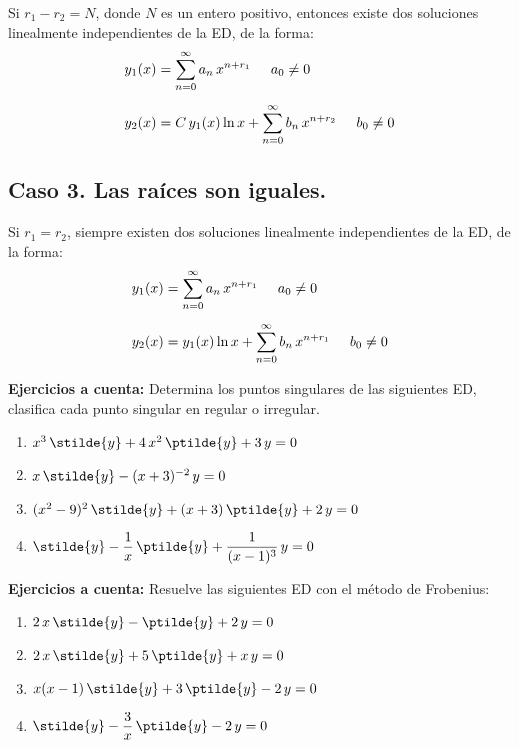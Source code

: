Si $r_{1} - r_{2} = N$, donde $N$ es un entero positivo, entonces existe dos soluciones linealmente independientes de la ED, de la forma:
\begin{subequations}
\begin{align}
y_{1} (x) &= \sum_{n=0}^{\infty} a_{n} \, x^{n+r_{1}} \hspace{0.5cm} a_{0} \neq 0 \label{eq:ecuacion_20a} \\[0.5em]
y_{2} (x) &= C \, y_{1} (x) \ln x + \sum_{n=0}^{\infty} b_{n} \, x^{n+r_{2}} \hspace{0.5cm} b_{0} \neq 0 \label{eq:ecuacion_20b}
\end{align}
\end{subequations}

\subsection*{Caso 3. Las raíces son iguales.}

Si $r_{1} = r_{2}$, siempre existen dos soluciones linealmente independientes de la ED, de la forma:
\begin{subequations}
\begin{align}
y_{1} (x) &= \sum_{n=0}^{\infty} a_{n} \, x^{n+r_{1}} \hspace{0.5cm} a_{0} \neq 0 \label{eq:ecuacion_21a} \\[0.5em]
y_{2} (x) &= y_{1} (x) \ln x + \sum_{n=0}^{\infty} b_{n} \, x^{n+r_{1}} \hspace{0.5cm} b_{0} \neq 0 \label{eq:ecuacion_21b}
\end{align}
\end{subequations}

\textbf{Ejercicios a cuenta:}
Determina los puntos singulares de las siguientes ED, clasifica cada punto singular en regular o irregular.
\begin{enumerate}
\item $x^{3} \, \stilde{y} + 4 \, x^{2} \, \ptilde{y} + 3 \, y = 0$
\item $x \, \stilde{y} - (x + 3)^{-2} \, y = 0$
\item $(x^{2} - 9)^{2} \, \stilde{y} + (x + 3) \, \ptilde{y} + 2 \, y = 0$
\item $\stilde{y} - \dfrac{1}{x} \, \ptilde{y} + \dfrac{1}{(x - 1)^{3}} \, y = 0$
\end{enumerate}

\textbf{Ejercicios a cuenta:}
Resuelve las siguientes ED con el método de Frobenius:
\begin{enumerate}
\item $2 \, x \, \stilde{y} - \ptilde{y} + 2 \, y = 0$
\item $2 \, x \, \stilde{y} + 5 \, \ptilde{y} + x \, y = 0$
\item $x (x - 1) \, \stilde{y} + 3 \, \ptilde{y} - 2 \, y = 0$
\item $\stilde{y} - \dfrac{3}{x} \, \ptilde{y} - 2 \, y = 0$
\end{enumerate}

